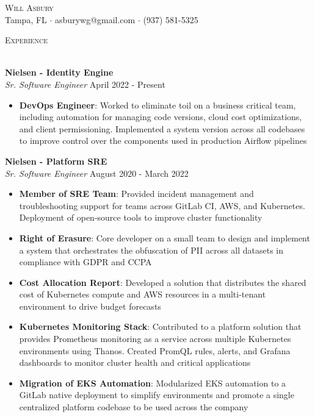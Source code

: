\documentclass[a4paper]{article}
\newcommand{\lineunder} {
    \vspace*{-8pt} \\
    \hspace*{-18pt} \hrulefill \\
}
\newcommand{\header} [1] {
    {\hspace*{-18pt}\vspace*{6pt} \textsc{#1}}
    \vspace*{-6pt} \lineunder
}
\begin{document}
\vspace*{-40pt}

\vspace*{-10pt}
\begin{center}
	{\Huge \scshape {Will Asbury}}\\
	Tampa, FL $\cdot$ asburywg@gmail.com $\cdot$ (937) 581-5325\\
\end{center}

\header{Experience}
\vspace{1mm}

\textbf{Nielsen - Identity Engine}\\
\textit{Sr. Software Engineer} \hfill April 2022 - Present\\
\vspace{-1mm}
\begin{itemize} \itemsep 1pt
    \item \textbf{DevOps Engineer}: Worked to eliminate toil on a business critical team, including automation for managing code versions, cloud cost optimizations, and client permissioning. Implemented a system version across all codebases to improve control over the components used in production Airflow pipelines
\end{itemize}

\textbf{Nielsen - Platform SRE}\\
\textit{Sr. Software Engineer} \hfill August 2020 - March 2022\\
\vspace{-1mm}
\begin{itemize} \itemsep 1pt
    \item \textbf{Member of SRE Team}: Provided incident management and troubleshooting support for teams across GitLab CI, AWS, and Kubernetes. Deployment of open-source tools to improve cluster functionality
    \item \textbf{Right of Erasure}: Core developer on a small team to design and implement a system that orchestrates the obfuscation of PII across all datasets in compliance with GDPR and CCPA
    \item \textbf{Cost Allocation Report}: Developed a solution that distributes the shared cost of Kubernetes compute and AWS resources in a multi-tenant environment to drive budget forecasts
    \item \textbf{Kubernetes Monitoring Stack}: Contributed to a platform solution that provides Prometheus monitoring as a service across multiple Kubernetes environments using Thanos. Created PromQL rules, alerts, and Grafana dashboards to monitor cluster health and critical applications
    \item \textbf{Migration of EKS Automation}: Modularized EKS automation to a GitLab native deployment to simplify environments and promote a single centralized platform codebase to be used across the company
\end{itemize}
\end{document}
